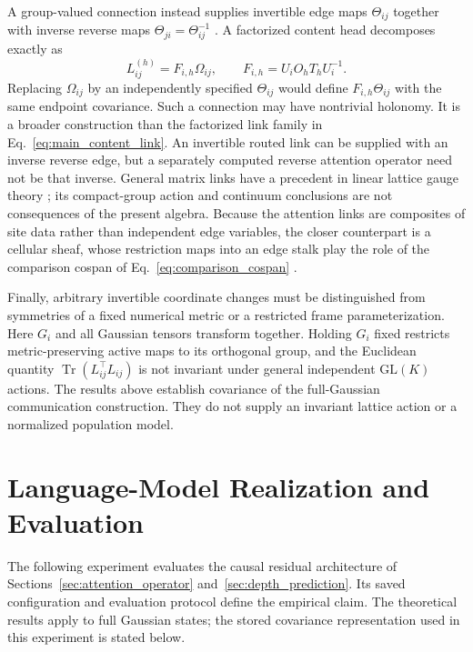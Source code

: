\documentclass[twoside,11pt]{article}
\begin{document}
A group-valued connection instead supplies invertible edge maps $\Theta_{ij}$ together with inverse reverse maps $\Theta_{ji}=\Theta_{ij}^{-1}$ \citep{WilsonConfinement1974}. A factorized content head decomposes exactly as
\begin{equation}
L_{ij}^{(h)}=F_{i,h}\Omega_{ij},\qquad
F_{i,h}=U_iO_hT_hU_i^{-1}.
\label{eq:main_processing_transport}
\end{equation}
Replacing $\Omega_{ij}$ by an independently specified $\Theta_{ij}$ would define $F_{i,h}\Theta_{ij}$ with the same endpoint covariance. Such a connection may have nontrivial holonomy. It is a broader construction than the factorized link family in Eq.~\eqref{eq:main_content_link}. An invertible routed link can be supplied with an inverse reverse edge, but a separately computed reverse attention operator need not be that inverse. General matrix links have a precedent in linear lattice gauge theory \citep{Wetterich2014LinearLattice}; its compact-group action and continuum conclusions are not consequences of the present algebra. Because the attention links are composites of site data rather than independent edge variables, the closer counterpart is a cellular sheaf, whose restriction maps into an edge stalk play the role of the comparison cospan of Eq.~\eqref{eq:comparison_cospan} \citep{HansenGhrist2019,Bodnar2022NeuralSheaf}.

Finally, arbitrary invertible coordinate changes must be distinguished from symmetries of a fixed numerical metric or a restricted frame parameterization. Here $G_i$ and all Gaussian tensors transform together. Holding $G_i$ fixed restricts metric-preserving active maps to its orthogonal group, and the Euclidean quantity $\operatorname{Tr}(L_{ij}^\top L_{ij})$ is not invariant under general independent $\mathrm{GL}(K)$ actions. The results above establish covariance of the full-Gaussian communication construction. They do not supply an invariant lattice action or a normalized population model.

\section{Language-Model Realization and Evaluation}
\label{sec:lm_realization}

The following experiment evaluates the causal residual architecture of Sections~\ref{sec:attention_operator} and~\ref{sec:depth_prediction}. Its saved configuration and evaluation protocol define the empirical claim. The theoretical results apply to full Gaussian states; the stored covariance representation used in this experiment is stated below.
\end{document}

